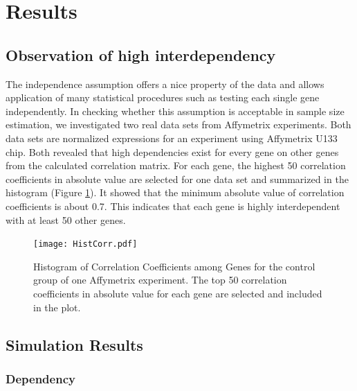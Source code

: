 \documentclass{bioinfo}
\begin{document}
\section{Results}

\subsection{Observation of high interdependency}
The independence assumption offers a nice property of the data and
allows application of many statistical procedures such as testing
each single gene independently. In checking whether this
assumption is acceptable in sample size estimation, we
investigated two real data sets from Affymetrix experiments. Both
data sets are normalized expressions for an experiment using
Affymetrix U133 chip. Both revealed that high dependencies exist
for every gene on other genes from the calculated correlation
matrix. For each gene, the highest 50 correlation coefficients in
absolute value are selected for one data set and summarized in the
histogram (Figure \ref{fig:HistCorr}). It showed that the minimum
absolute value of correlation coefficients is about 0.7. This
indicates that each gene is highly interdependent with at least 50
other genes.

\begin{figure}[h]
  \centerline{\texttt{[image: HistCorr.pdf]}}
  \caption[Histogram of Correlation Coefficients among Genes]
  {Histogram of Correlation Coefficients among Genes for the control group of one Affymetrix
    experiment. The top 50 correlation coefficients in absolute value for each gene are selected and included in the plot.}
  \label{fig:HistCorr}
\end{figure}

\subsection{Simulation Results}

\subsubsection{Dependency}
\end{document}
